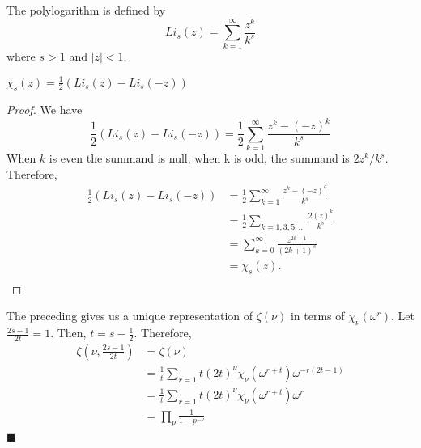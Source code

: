 \documentclass[../article.tex]{subfiles}
\begin{document}
\begin{definition}
The polylogarithm is defined by
\begin{equation}
Li_{s}(z) = \sum_{k=1}^{\infty} \frac{z^k}{k^s}
\end{equation}
where $s > 1$ and $|z| < 1$.
\end{definition}

\begin{theorem}
$\chi_{s}(z) = \frac{1}{2} (Li_{s}(z) - Li_{s}(-z))$
\end{theorem}
\begin{proof}
We have
\begin{equation}
\frac{1}{2} (Li_{s}(z) - Li_{s}(-z)) = \frac{1}{2} \sum_{k=1}^{\infty} \frac{z^{k} - (-z)^k}{k^s}
\end{equation}
When $k$ is even the summand is null; when k is odd, the summand is $2z^{k}/k^s$. Therefore,
\begin{equation}
\begin{split}
\frac{1}{2} (Li_{s}(z) - Li_{s}(-z)) &= \frac{1}{2} \sum_{k=1}^{\infty} \frac{z^{k} - (-z)^k}{k^s} \\
&= \frac{1}{2} \sum_{k=1,3,5,...} \frac{2(z)^k}{k^s} \\
&= \sum_{k=0}^{\infty} \frac{z^{2k+1}}{(2k+1)^s} \\
&= \chi_{s}(z). \\
\end{split}
\end{equation}
\end{proof}
\begin{corollary}
The preceding gives us a unique representation of $\zeta(\nu)$ in terms of $\chi_{\nu}(\omega^r)$. Let $\frac{2s-1}{2t} = 1$. Then, $t = s - \frac{1}{2}.$ Therefore,
\begin{equation}
\begin{split}
\zeta(\nu, \frac{2s-1}{2t}) &= \zeta(\nu) \\
&= \frac{1}{t} \sum_{r=1}{t} (2t)^{\nu} \chi_{\nu}(\omega^{r+t}) \omega^{-r(2t-1)} \\
&= \frac{1}{t} \sum_{r=1}{t} (2t)^{\nu} \chi_{\nu}(\omega^{r+t}) \omega^{r} \\
&= \prod_{p} \frac{1}{1- p^{-\nu}} \\
\end{split}
\end{equation}$\blacksquare$
\end{corollary}
\end{document}

